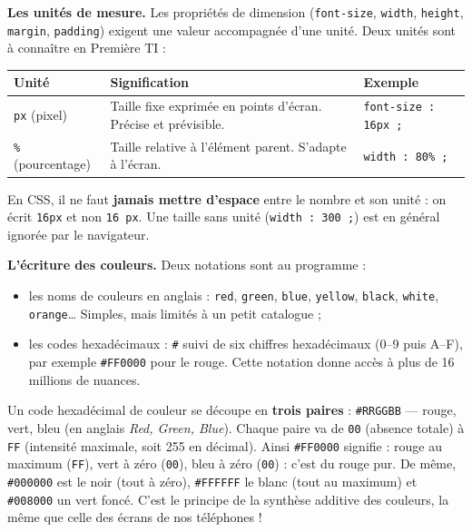\documentclass[11pt]{article}
\newcommand{\cle}[1]{{\popxbold\color{popdark}#1}}
\begin{document}
\textbf{Les unités de mesure.} Les propriétés de dimension (\texttt{font-size}, \texttt{width}, \texttt{height}, \texttt{margin}, \texttt{padding}) exigent une valeur accompagnée d'une \cle{unité}. Deux unités sont à connaître en Première TI :

\begin{center}
\begin{tabularx}{\linewidth}{|l|X|X|}
\hline
\rowcolor{popblueL} \textbf{Unité} & \textbf{Signification} & \textbf{Exemple} \\
\hline
\texttt{px} (pixel) & Taille fixe exprimée en points d'écran. Précise et prévisible. & \texttt{font-size : 16px ;} \\
\hline
\texttt{\%} (pourcentage) & Taille relative à l'élément parent. S'adapte à l'écran. & \texttt{width : 80\% ;} \\
\hline
\end{tabularx}
\end{center}

\begin{attention}
En CSS, il ne faut \textbf{jamais mettre d'espace} entre le nombre et son unité : on écrit \texttt{16px} et non \texttt{16 px}. Une taille sans unité (\texttt{width : 300 ;}) est en général ignorée par le navigateur.
\end{attention}

\textbf{L'écriture des couleurs.} Deux notations sont au programme :
\begin{itemize}
  \item les \cle{noms de couleurs} en anglais : \texttt{red}, \texttt{green}, \texttt{blue}, \texttt{yellow}, \texttt{black}, \texttt{white}, \texttt{orange}\ldots{} Simples, mais limités à un petit catalogue ;
  \item les \cle{codes hexadécimaux} : \texttt{\#} suivi de six chiffres hexadécimaux (0--9 puis A--F), par exemple \texttt{\#FF0000} pour le rouge. Cette notation donne accès à plus de 16 millions de nuances.
\end{itemize}

\begin{savaistu}
Un code hexadécimal de couleur se découpe en \textbf{trois paires} : \texttt{\#RRGGBB} — rouge, vert, bleu (en anglais \emph{Red, Green, Blue}). Chaque paire va de \texttt{00} (absence totale) à \texttt{FF} (intensité maximale, soit 255 en décimal). Ainsi \texttt{\#FF0000} signifie : rouge au maximum (\texttt{FF}), vert à zéro (\texttt{00}), bleu à zéro (\texttt{00}) : c'est du rouge pur. De même, \texttt{\#000000} est le noir (tout à zéro), \texttt{\#FFFFFF} le blanc (tout au maximum) et \texttt{\#008000} un vert foncé. C'est le principe de la synthèse additive des couleurs, la même que celle des écrans de nos téléphones !
\end{savaistu}
\end{document}
